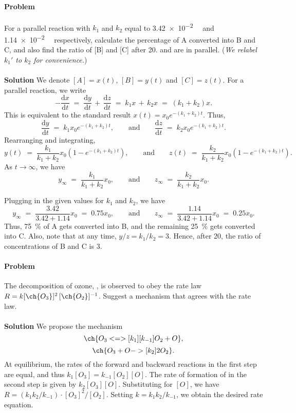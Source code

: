 \documentclass[10pt]{article}
\newcounter{prob}
\def\problem{\stepcounter{prob}\paragraph{Problem \arabic{prob}}}
\def\solution{\\\\\textbf{Solution }}
\begin{document}
        \problem For a parallel reaction with $k_1$ and $k_2$ equal to \SI{3.42e-2}{\per\min} and \SI{1.14e-2}{{\per\min}} respectively,
        calculate the percentage of A converted into B and C, and also find the ratio of [B] and [C] after \SI{20}{\min}.
         and  are in parallel.
        (\textit{We relabel $k_1'$ to $k_2$ for convenience.})
        \solution 
        We denote $[A] = x(t)$, $[B] = y(t)$ and $[C] = z(t)$.
        For a parallel reaction, we write
        \[
        -\frac{\mathrm{d}x}{\mathrm{d}t} \;=\; \frac{\mathrm{d} y}{\mathrm{d}t} \,+\, \frac{\mathrm{d} z}{\mathrm{d}t} \;=\; k_1x \,+\, k_2x
                \;=\; (k_1 + k_2)x.
        \]
        This is equivalent to the standard result $x(t) = x_0e^{-(k_1 + k_2)t}$. Thus,
        \[
        \frac{\mathrm{d} y}{\mathrm{d}t} \;=\; k_1x_0e^{-(k_1 + k_2)t},\quad\quad\text{and}\quad\quad
                \frac{\mathrm{d} z}{\mathrm{d}t} \;=\; k_2x_0e^{-(k_1 + k_2)t}.
        \]
        Rearranging and integrating,
        \[
        y(t) \;=\; \frac{k_1}{k_1 + k_2} x_0(1 - e^{-(k_1 + k_2)t}), \quad\quad\text{and}\quad\quad
                z(t) \;=\; \frac{k_2}{k_1 + k_2} x_0(1 - e^{-(k_1 + k_2)t}).
        \]
        As $t \to \infty$, we have
        \[
        y_{\infty} \;=\; \frac{k_1}{k_1 + k_2} x_0,  \quad\quad\text{and}\quad\quad z_{\infty} \;=\; \frac{k_2}{k_1 + k_2}x_0.
        \]

        Plugging in the given values for $k_1$ and $k_2$, we have
        \[
        y_\infty \;=\; \frac{3.42}{3.42 + 1.14} x_0 \;=\; 0.75 x_0,\quad\quad\text{and}\quad\quad
                z_\infty \;=\; \frac{1.14}{3.42 + 1.14} x_0 \;=\; 0.25x_0.
        \]
        Thus, \SI{75}{\percent} of A gets converted into B, and the remaining \SI{25}{\percent} gets converted into C.
        Also, note that at any time, $y/ z = k_1 / k_2 = 3$. Hence, after \SI{20}{\min}, the ratio of concentrations of B and C is 3.

        \problem The decomposition of ozone, , is observed to obey the rate law $R = k[\ch{O_3}]^2\, [\ch{O_2}]^{-1}$.
        Suggest a mechanism that agrees with the rate law.
        \solution We propose the mechanism
        \[ \ch{O_3 <=>[ k_1 ][ k_{-1} ] O_2 + O},   \]
        \[ \ch{O_3 + O ->[ k_2 ] 2 O_2}. \]
        At equilibrium, the rates of the forward and backward reactions in the first step are equal, and thus $k_1[O_3] = k_{-1}[O_2][O]$.
        The rate of formation of  in the second step is given by $k_2[O_3][O]$.
        Substituting for $[O]$, we have $R = (k_1 k_2 /k_{-1})\cdot [O_3]^2 /[O_2]$.
        Setting $k = k_1 k_2 /k_{-1}$, we obtain the desired rate equation.
\end{document}

